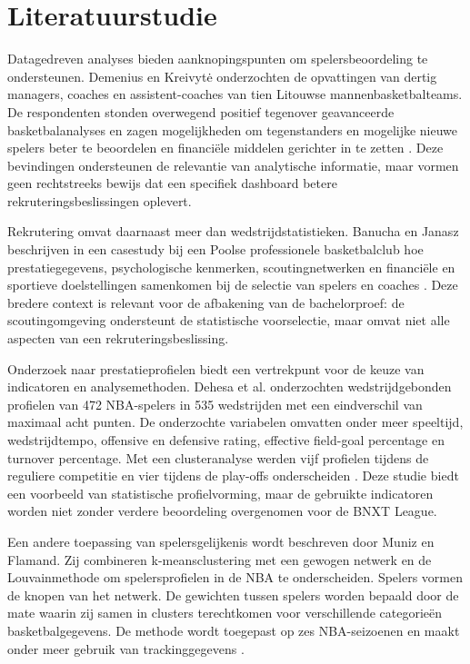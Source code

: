\section{Literatuurstudie}%
\label{sec:literatuurstudie}

Datagedreven analyses bieden aanknopingspunten om spelersbeoordeling te ondersteunen. Demenius en Kreivytė onderzochten de opvattingen van dertig managers, coaches en assistent-coaches van tien Litouwse mannenbasketbalteams. De respondenten stonden overwegend positief tegenover geavanceerde basketbalanalyses en zagen mogelijkheden om tegenstanders en mogelijke nieuwe spelers beter te beoordelen en financiële middelen gerichter in te zetten \autocite{demenius2017benefits}. Deze bevindingen ondersteunen de relevantie van analytische informatie, maar vormen geen rechtstreeks bewijs dat een specifiek dashboard betere rekruteringsbeslissingen oplevert.

Rekrutering omvat daarnaast meer dan wedstrijdstatistieken. Banucha en Janasz beschrijven in een casestudy bij een Poolse professionele basketbalclub hoe prestatiegegevens, psychologische kenmerken, scoutingnetwerken en financiële en sportieve doelstellingen samenkomen bij de selectie van spelers en coaches \autocite{banucha2025strategic}. Deze bredere context is relevant voor de afbakening van de bachelorproef: de scoutingomgeving ondersteunt de statistische voorselectie, maar omvat niet alle aspecten van een rekruteringsbeslissing.

Onderzoek naar prestatieprofielen biedt een vertrekpunt voor de keuze van indicatoren en analysemethoden. Dehesa et al. onderzochten wedstrijdgebonden profielen van 472 NBA-spelers in 535 wedstrijden met een eindverschil van maximaal acht punten. De onderzochte variabelen omvatten onder meer speeltijd, wedstrijdtempo, offensive en defensive rating, effective field-goal percentage en turnover percentage. Met een clusteranalyse werden vijf profielen tijdens de reguliere competitie en vier tijdens de play-offs onderscheiden \autocite{dehesa2019key}. Deze studie biedt een voorbeeld van statistische profielvorming, maar de gebruikte indicatoren worden niet zonder verdere beoordeling overgenomen voor de BNXT League.

Een andere toepassing van spelersgelijkenis wordt beschreven door Muniz en Flamand. Zij combineren k-meansclustering met een gewogen netwerk en de Louvainmethode om spelersprofielen in de NBA te onderscheiden. Spelers vormen de knopen van het netwerk. De gewichten tussen spelers worden bepaald door de mate waarin zij samen in clusters terechtkomen voor verschillende categorieën basketbalgegevens. De methode wordt toegepast op zes NBA-seizoenen en maakt onder meer gebruik van trackinggegevens \autocite{muniz2022weighted}.

